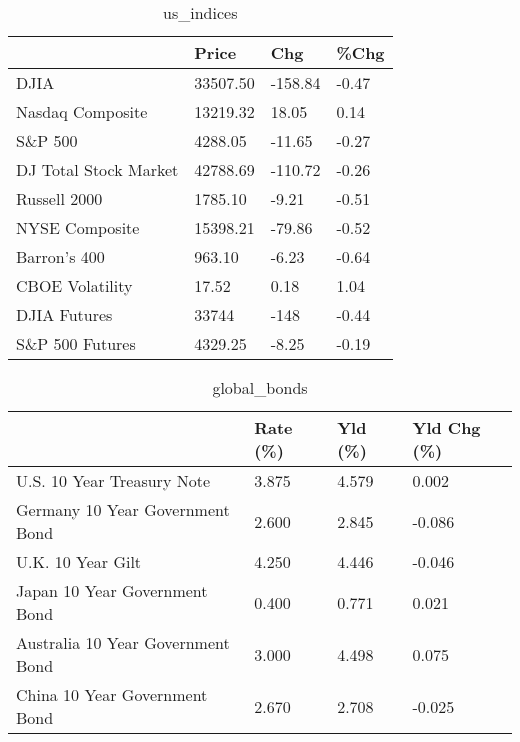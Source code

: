 \documentclass{article}%
\begin{document}
%


\begin{table}[htbp]%
\caption{us\_indices}%
\centering%
\begin{adjustbox}{width=1\textwidth}%
\begin{tabular}{llll}
\toprule
                      &    Price &     Chg &  \%Chg \\
\midrule
                 DJIA & 33507.50 & -158.84 & -0.47 \\
     Nasdaq Composite & 13219.32 &   18.05 &  0.14 \\
              S\&P 500 &  4288.05 &  -11.65 & -0.27 \\
DJ Total Stock Market & 42788.69 & -110.72 & -0.26 \\
         Russell 2000 &  1785.10 &   -9.21 & -0.51 \\
       NYSE Composite & 15398.21 &  -79.86 & -0.52 \\
         Barron's 400 &   963.10 &   -6.23 & -0.64 \\
      CBOE Volatility &    17.52 &    0.18 &  1.04 \\
         DJIA Futures &    33744 &    -148 & -0.44 \\
      S\&P 500 Futures &  4329.25 &   -8.25 & -0.19 \\
\bottomrule
\end{tabular}
%
\end{adjustbox}%
\end{table}

%


\begin{table}[htbp]%
\caption{global\_bonds}%
\centering%
\begin{adjustbox}{width=1\textwidth}%
\begin{tabular}{llll}
\toprule
                                  & Rate (\%) & Yld (\%) & Yld Chg (\%) \\
\midrule
       U.S. 10 Year Treasury Note &    3.875 &   4.579 &       0.002 \\
  Germany 10 Year Government Bond &    2.600 &   2.845 &      -0.086 \\
                U.K. 10 Year Gilt &    4.250 &   4.446 &      -0.046 \\
    Japan 10 Year Government Bond &    0.400 &   0.771 &       0.021 \\
Australia 10 Year Government Bond &    3.000 &   4.498 &       0.075 \\
    China 10 Year Government Bond &    2.670 &   2.708 &      -0.025 \\
\bottomrule
\end{tabular}
%
\end{adjustbox}%
\end{table}
\end{document}
